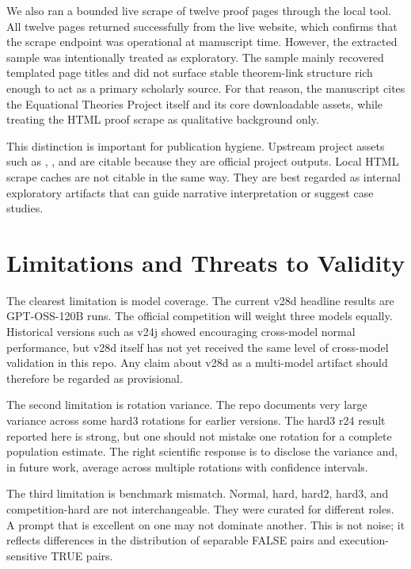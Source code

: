 \documentclass[12pt]{amsart}
\begin{document}
We also ran a bounded live scrape of twelve proof pages through the local  tool. All twelve pages returned successfully from the live website, which confirms that the scrape endpoint was operational at manuscript time. However, the extracted sample was intentionally treated as exploratory. The sample mainly recovered templated page titles and did not surface stable theorem-link structure rich enough to act as a primary scholarly source. For that reason, the manuscript cites the Equational Theories Project itself and its core downloadable assets, while treating the HTML proof scrape as qualitative background only.

This distinction is important for publication hygiene. Upstream project assets such as , , and  are citable because they are official project outputs. Local HTML scrape caches are not citable in the same way. They are best regarded as internal exploratory artifacts that can guide narrative interpretation or suggest case studies.

\section{Limitations and Threats to Validity}

The clearest limitation is model coverage. The current v28d headline results are GPT-OSS-120B runs. The official competition will weight three models equally. Historical versions such as v24j showed encouraging cross-model normal performance, but v28d itself has not yet received the same level of cross-model validation in this repo. Any claim about v28d as a multi-model artifact should therefore be regarded as provisional.

The second limitation is rotation variance. The repo documents very large variance across some hard3 rotations for earlier versions. The hard3 r24 result reported here is strong, but one should not mistake one rotation for a complete population estimate. The right scientific response is to disclose the variance and, in future work, average across multiple rotations with confidence intervals.

The third limitation is benchmark mismatch. Normal, hard, hard2, hard3, and competition-hard are not interchangeable. They were curated for different roles. A prompt that is excellent on one may not dominate another. This is not noise; it reflects differences in the distribution of separable FALSE pairs and execution-sensitive TRUE pairs.
\end{document}
